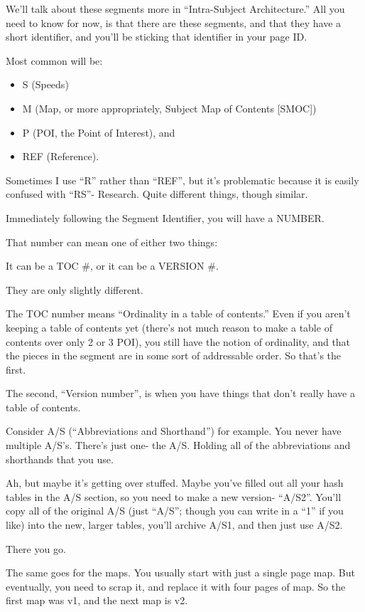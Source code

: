 \documentclass[oneside]{book}
\begin{document}
We'll talk about these segments more in ``Intra-Subject Architecture.''
All you need to know for now, is that there are these segments, and
that they have a short identifier, and you'll be sticking that
identifier in your page ID.

Most common will be:
\begin{itemize}
\item S   (Speeds)
\item M   (Map, or more appropriately, Subject Map of Contents [SMOC])
\item P   (POI, the Point of Interest), and
\item REF (Reference).
\end{itemize}

Sometimes I use ``R'' rather than ``REF'', but it's problematic because it
is easily confused with ``RS''- Research. Quite different things, though
similar.

Immediately following the Segment Identifier, you will have a NUMBER.

That number can mean one of either two things:

It can be a TOC \#, or it can be a VERSION \#.

They are only slightly different.

The TOC number means ``Ordinality in a table of contents.'' Even if you
aren't keeping a table of contents yet (there's not much reason to
make a table of contents over only 2 or 3 POI), you still have the
notion of ordinality, and that the pieces in the segment are in some
sort of addressable order. So that's the first.

The second, ``Version number'', is when you have things that don't really have
a table of contents.

Consider A/S (``Abbreviations and Shorthand'') for example. You never have
multiple A/S's. There's just one- the A/S. Holding all of the
abbreviations and shorthands that you use.

Ah, but maybe it's getting over stuffed. Maybe you've filled out all
your hash tables in the A/S section, so you need to make a new
version- ``A/S2''. You'll copy all of the original A/S (just ``A/S'';
though you can write in a ``1'' if you like) into the new, larger
tables, you'll archive A/S1, and then just use A/S2.

There you go.

The same goes for the maps. You usually start with just a single page
map. But eventually, you need to scrap it, and replace it with four
pages of map. So the first map was v1, and the next map is v2.
\end{document}
